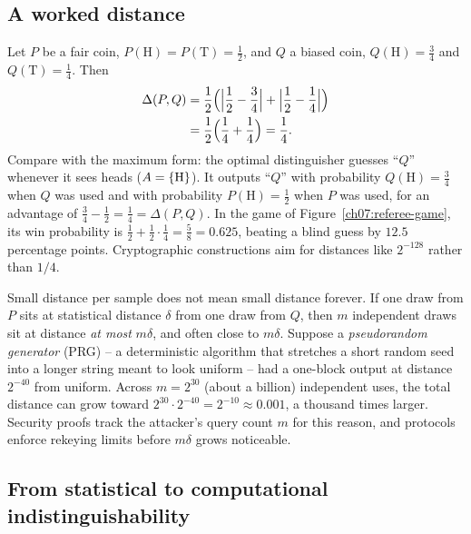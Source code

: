\subsection{A worked distance}

\begin{example}
\label{ch07:two-coins}
Let $P$ be a fair coin, $P(\mathrm{H}) = P(\mathrm{T}) = \frac{1}{2}$, and $Q$ a biased coin, $Q(\mathrm{H}) = \frac{3}{4}$ and $Q(\mathrm{T}) = \frac{1}{4}$. Then
\begin{align*}
  \Delta(P, Q) &= \frac{1}{2}\Bigl( \Bigl\lvert \frac{1}{2} - \frac{3}{4} \Bigr\rvert + \Bigl\lvert \frac{1}{2} - \frac{1}{4} \Bigr\rvert \Bigr) \\
               &= \frac{1}{2}\Bigl( \frac{1}{4} + \frac{1}{4} \Bigr) = \frac{1}{4}.
\end{align*}
Compare with the maximum form: the optimal distinguisher guesses ``$Q$'' whenever it sees heads ($A = \{\mathrm{H}\}$). It outputs ``$Q$'' with probability $Q(\mathrm{H}) = \frac{3}{4}$ when $Q$ was used and with probability $P(\mathrm{H}) = \frac{1}{2}$ when $P$ was used, for an advantage of $\frac{3}{4} - \frac{1}{2} = \frac{1}{4} = \Delta(P, Q)$. In the game of Figure~\ref{ch07:referee-game}, its win probability is $\frac{1}{2} + \frac{1}{2}\cdot\frac{1}{4} = \frac{5}{8} = 0.625$, beating a blind guess by $12.5$ percentage points. Cryptographic constructions aim for distances like $2^{-128}$ rather than $1/4$.
\end{example}

\begin{trapbox}
Small distance per sample does not mean small distance forever. If one draw from $P$ sits at statistical distance $\delta$ from one draw from $Q$, then $m$ independent draws sit at distance \emph{at most} $m\delta$, and often close to $m\delta$. Suppose a \emph{pseudorandom generator} (PRG) -- a deterministic algorithm that stretches a short random seed into a longer string meant to look uniform -- had a one-block output at distance $2^{-40}$ from uniform. Across $m = 2^{30}$ (about a billion) independent uses, the total distance can grow toward $2^{30}\cdot 2^{-40} = 2^{-10} \approx 0.001$, a thousand times larger. Security proofs track the attacker's query count $m$ for this reason, and protocols enforce rekeying limits before $m\delta$ grows noticeable.
\end{trapbox}

\subsection{From statistical to computational indistinguishability}

